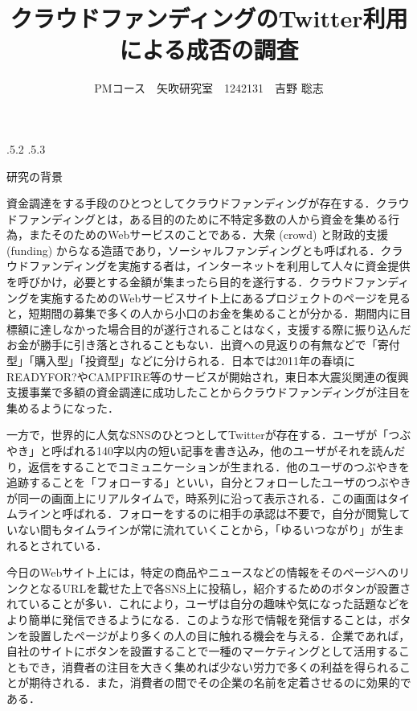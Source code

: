 \documentclass[uplatex]{jsarticle}
\title{\vspace{-14mm}クラウドファンディングのTwitter利用による成否の調査}
\author{PMコース　矢吹研究室　1242131　吉野 聡志}
\date{}%
\makeatletter
\renewcommand{\section}{%
    \if@slide\clearpage\fi
    \@startsection{section}{1}{\z@}%
    {\Cvs \@plus.5\Cdp \@minus.2\Cdp}%
    {.5\Cvs \@plus.3\Cdp}%
    {\normalfont\raggedright}}
\makeatother
\begin{document}
\maketitle





\section{研究の背景}

資金調達をする手段のひとつとしてクラウドファンディングが存在する．クラウドファンディングとは，ある目的のために不特定多数の人から資金を集める行為，またそのためのWebサービスのことである．大衆 (crowd) と財政的支援 (funding) からなる造語であり，ソーシャルファンディングとも呼ばれる．クラウドファンディングを実施する者は，インターネットを利用して人々に資金提供を呼びかけ，必要とする金額が集まったら目的を遂行する．クラウドファンディングを実施するためのWebサービスサイト上にあるプロジェクトのページを見ると，短期間の募集で多くの人から小口のお金を集めることが分かる．期間内に目標額に達しなかった場合目的が遂行されることはなく，支援する際に振り込んだお金が勝手に引き落とされることもない．出資への見返りの有無などで「寄付型」「購入型」「投資型」などに分けられる．日本では2011年の春頃にREADYFOR?やCAMPFIRE等のサービスが開始され，東日本大震災関連の復興支援事業で多額の資金調達に成功したことからクラウドファンディングが注目を集めるようになった．

一方で，世界的に人気なSNSのひとつとしてTwitterが存在する．ユーザが「つぶやき」と呼ばれる140字以内の短い記事を書き込み，他のユーザがそれを読んだり，返信をすることでコミュニケーションが生まれる．他のユーザのつぶやきを追跡することを「フォローする」といい，自分とフォローしたユーザのつぶやきが同一の画面上にリアルタイムで，時系列に沿って表示される．この画面はタイムラインと呼ばれる．フォローをするのに相手の承認は不要で，自分が閲覧していない間もタイムラインが常に流れていくことから，「ゆるいつながり」が生まれるとされている．

今日のWebサイト上には，特定の商品やニュースなどの情報をそのページへのリンクとなるURLを載せた上で各SNS上に投稿し，紹介するためのボタンが設置されていることが多い．これにより，ユーザは自分の趣味や気になった話題などをより簡単に発信できるようになる．このような形で情報を発信することは，ボタンを設置したページがより多くの人の目に触れる機会を与える．企業であれば，自社のサイトにボタンを設置することで一種のマーケティングとして活用することもでき，消費者の注目を大きく集めれば少ない労力で多くの利益を得られることが期待される．また，消費者の間でその企業の名前を定着させるのに効果的である．
\end{document}
